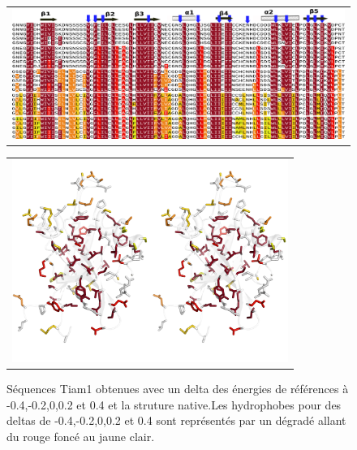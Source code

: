     \clearpage
\begin{landscape}

   \begin{figure}[t]
     \centering
     \begin{tabular}{c}
       \includegraphics[width=18cm]{boost_hydro/alignTIAM1.png} \\
     \end{tabular}
\label{result:PDZ_seed}
   \end{figure}

   \begin{figure}[t]
     \centering
     \begin{tabular}{c}
       \includegraphics[width=9cm]{boost_hydro/structureTIAM1.png} \\
     \end{tabular}

     \caption{\small Séquences Tiam1 obtenues avec un delta des énergies de références à -0.4,-0.2,0,0.2 et 0.4 et la struture native.Les hydrophobes pour des deltas de -0.4,-0.2,0,0.2 et 0.4 sont représentés par un dégradé allant du rouge foncé au jaune clair.}

\label{result:PDZ_seed}
   \end{figure}

\end{landscape}

